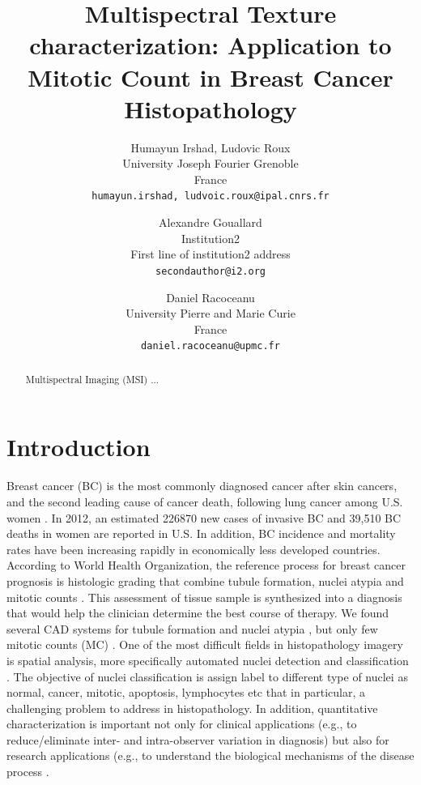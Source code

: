 \documentclass[10pt,twocolumn,letterpaper]{article}
\begin{document}
\title{Multispectral Texture characterization: Application to Mitotic Count in Breast Cancer Histopathology}

\author{Humayun Irshad, Ludovic Roux\\
	University Joseph Fourier Grenoble \\ France\\
	{\tt\small {humayun.irshad, ludvoic.roux}@ipal.cnrs.fr} \\
	\and 
	Alexandre Gouallard\\
	Institution2\\ First line of institution2 address\\
	{\tt\small secondauthor@i2.org} \\
	\and
	Daniel Racoceanu\\
	University Pierre and Marie Curie \\ France\\
	{\tt\small daniel.racoceanu@upmc.fr}
}

\maketitle

\begin{abstract}
Multispectral Imaging (MSI) ...
\end{abstract}

\section{Introduction}
Breast cancer (BC) is the most commonly diagnosed cancer after skin cancers, and the second leading cause of cancer death, following lung cancer among U.S. women \cite{jiemin2013}. In 2012, an estimated 226870 new cases of invasive BC and 39,510 BC deaths in women are reported in U.S. In addition, BC incidence and mortality rates have been increasing rapidly in economically less developed countries. According to World Health Organization, the reference process for breast cancer prognosis is histologic grading that combine tubule formation, nuclei atypia and mitotic counts \cite{bloom1957, elston1993}. This assessment of tissue sample is synthesized into a diagnosis that would help the clinician determine the best course of therapy. We found several CAD systems for tubule formation \cite{petushi2006, naik2008} and nuclei atypia \cite{cosatto2008, dalle2009, chaudhury2011, dundar2011}, but only few mitotic counts (MC) \cite{irshad2013a, irshad2013b}. One of the most difficult fields in histopathology imagery is spatial analysis, more specifically automated nuclei detection and classification \cite{fuchs2011}. The objective of nuclei classification is assign label to different type of nuclei as normal, cancer, mitotic, apoptosis, lymphocytes etc that in particular, a challenging problem to address in histopathology. In addition, quantitative characterization is important not only for clinical applications (e.g., to reduce/eliminate inter- and intra-observer variation in diagnosis) but also for research applications (e.g., to understand the biological mechanisms of the disease process \cite{gurcan2009}.
 
\end{document}
